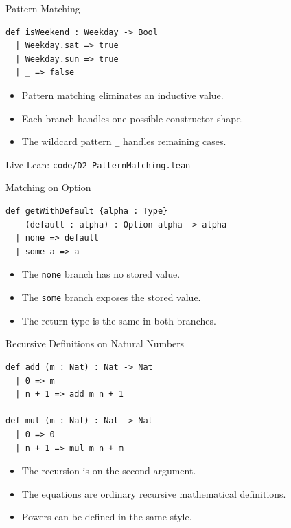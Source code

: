 ﻿\documentclass[aspectratio=169,11pt]{beamer}
\newcommand{\leanfile}[1]{\vfill{\small\color{gray}Live Lean: \texttt{#1}}}
\begin{document}
\begin{frame}[fragile]{Pattern Matching}
  \begin{lstlisting}
def isWeekend : Weekday -> Bool
  | Weekday.sat => true
  | Weekday.sun => true
  | _ => false
  \end{lstlisting}

  \begin{itemize}
    \item Pattern matching eliminates an inductive value.
    \item Each branch handles one possible constructor shape.
    \item The wildcard pattern \texttt{\_} handles remaining cases.
  \end{itemize}

  \leanfile{code/D2\_PatternMatching.lean}
\end{frame}

\begin{frame}[fragile]{Matching on Option}
  \begin{lstlisting}
def getWithDefault {alpha : Type}
    (default : alpha) : Option alpha -> alpha
  | none => default
  | some a => a
  \end{lstlisting}

  \begin{itemize}
    \item The \texttt{none} branch has no stored value.
    \item The \texttt{some} branch exposes the stored value.
    \item The return type is the same in both branches.
  \end{itemize}
\end{frame}

\begin{frame}[fragile]{Recursive Definitions on Natural Numbers}
  \begin{lstlisting}
def add (m : Nat) : Nat -> Nat
  | 0 => m
  | n + 1 => add m n + 1

def mul (m : Nat) : Nat -> Nat
  | 0 => 0
  | n + 1 => mul m n + m
  \end{lstlisting}

  \begin{itemize}
    \item The recursion is on the second argument.
    \item The equations are ordinary recursive mathematical definitions.
    \item Powers can be defined in the same style.
  \end{itemize}
\end{frame}
\end{document}
